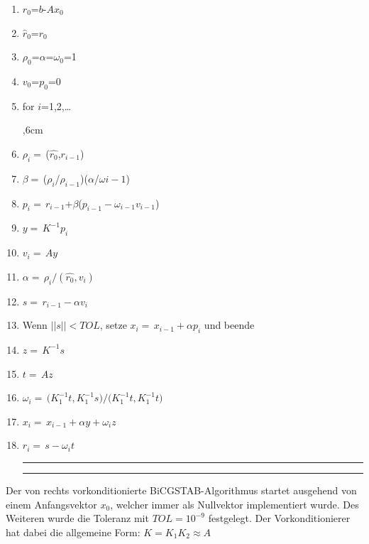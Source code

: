 \begin{enumerate}
	\setlength{\itemsep}{-6pt}
\hrule\hrule
	
	
	\item $r_0$=$b$-$A$$x_0$
	\item $\hat{r}_0$=$r_0$
	\item $\rho_0$=$\alpha$=$\omega_0$=1
	\item $v_0$=$p_0$=0
	\item for $i$=1,2,\dots
	\par
	\begingroup
	,6cm 
	\noindent 
	\item$\rho_i=$\,($\hat{r_0}$,$r_{i-1}$)
	\item$\beta=$\,($\rho_i$/$\rho_{i-1}$)($\alpha$/$\omega{i-1}$)
	\item$p_i=$\,$r_{i-1}$+$\beta$($p_{i-1}-\omega_{i-1}v_{i-1}$)	
	\item$y=$\,$K^{-1}p_i$
	\item$v_i=$\,$Ay$
	\item$\alpha=$\,$\rho_i/(\hat{r_0},v_i)$
	\item$s=$\,$r_{i-1}-\alpha$$v_i$
	\item Wenn $||s|| < TOL$, setze $x_i=$\,$x_{i-1}+\alpha$$p_i$ und beende 
	\item$z=$\,$K^{-1}s$
	\item$t=$\,$Az$
	\item$\omega_i=$\,$(K^{-1}_1$$t,K^{-1}_1$$s)/(K^{-1}_1$$t,K^{-1}_1$$t)$ 
	\item$x_i=$\,$x_{i-1}+\alpha$$y+\omega_i$$z$
	\item$r_i=$\,$s-\omega_i$$t$\\
	
	\hrule\hrule
	\par
	\endgroup 
	
\end{enumerate}



Der von rechts vorkonditionierte BiCGSTAB-Algorithmus startet ausgehend von einem Anfangsvektor $x_0$, welcher immer als Nullvektor implementiert wurde. Des Weiteren wurde die Toleranz mit $TOL= 10^{-9}$ festgelegt. Der Vorkonditionierer hat dabei die allgemeine Form: 
$K = K_1 K_2 \approx A $
